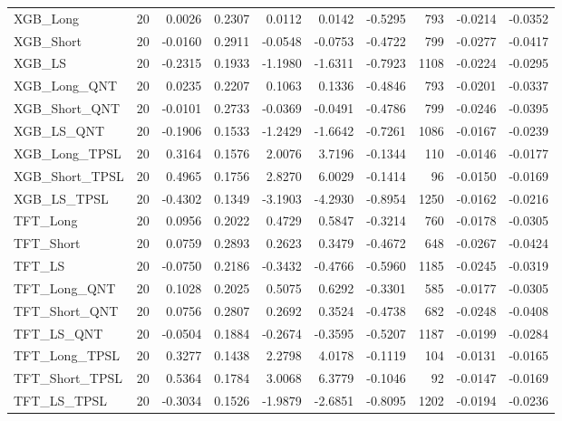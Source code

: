 \begin{tabular}{llrrrrrrrr}
\cline{1-10}
XGB\_Long & 20 & 0.0026 & 0.2307 & 0.0112 & 0.0142 & -0.5295 & 793 & -0.0214 & -0.0352 \\
\cline{1-10}
XGB\_Short & 20 & -0.0160 & 0.2911 & -0.0548 & -0.0753 & -0.4722 & 799 & -0.0277 & -0.0417 \\
\cline{1-10}
XGB\_LS & 20 & -0.2315 & 0.1933 & -1.1980 & -1.6311 & -0.7923 & 1108 & -0.0224 & -0.0295 \\
\cline{1-10}
XGB\_Long\_QNT & 20 & 0.0235 & 0.2207 & 0.1063 & 0.1336 & -0.4846 & 793 & -0.0201 & -0.0337 \\
\cline{1-10}
XGB\_Short\_QNT & 20 & -0.0101 & 0.2733 & -0.0369 & -0.0491 & -0.4786 & 799 & -0.0246 & -0.0395 \\
\cline{1-10}
XGB\_LS\_QNT & 20 & -0.1906 & 0.1533 & -1.2429 & -1.6642 & -0.7261 & 1086 & -0.0167 & -0.0239 \\
\cline{1-10}
XGB\_Long\_TPSL & 20 & 0.3164 & 0.1576 & 2.0076 & 3.7196 & -0.1344 & 110 & -0.0146 & -0.0177 \\
\cline{1-10}
XGB\_Short\_TPSL & 20 & 0.4965 & 0.1756 & 2.8270 & 6.0029 & -0.1414 & 96 & -0.0150 & -0.0169 \\
\cline{1-10}
XGB\_LS\_TPSL & 20 & -0.4302 & 0.1349 & -3.1903 & -4.2930 & -0.8954 & 1250 & -0.0162 & -0.0216 \\
\cline{1-10}
TFT\_Long & 20 & 0.0956 & 0.2022 & 0.4729 & 0.5847 & -0.3214 & 760 & -0.0178 & -0.0305 \\
\cline{1-10}
TFT\_Short & 20 & 0.0759 & 0.2893 & 0.2623 & 0.3479 & -0.4672 & 648 & -0.0267 & -0.0424 \\
\cline{1-10}
TFT\_LS & 20 & -0.0750 & 0.2186 & -0.3432 & -0.4766 & -0.5960 & 1185 & -0.0245 & -0.0319 \\
\cline{1-10}
TFT\_Long\_QNT & 20 & 0.1028 & 0.2025 & 0.5075 & 0.6292 & -0.3301 & 585 & -0.0177 & -0.0305 \\
\cline{1-10}
TFT\_Short\_QNT & 20 & 0.0756 & 0.2807 & 0.2692 & 0.3524 & -0.4738 & 682 & -0.0248 & -0.0408 \\
\cline{1-10}
TFT\_LS\_QNT & 20 & -0.0504 & 0.1884 & -0.2674 & -0.3595 & -0.5207 & 1187 & -0.0199 & -0.0284 \\
\cline{1-10}
TFT\_Long\_TPSL & 20 & 0.3277 & 0.1438 & 2.2798 & 4.0178 & -0.1119 & 104 & -0.0131 & -0.0165 \\
\cline{1-10}
TFT\_Short\_TPSL & 20 & 0.5364 & 0.1784 & 3.0068 & 6.3779 & -0.1046 & 92 & -0.0147 & -0.0169 \\
\cline{1-10}
TFT\_LS\_TPSL & 20 & -0.3034 & 0.1526 & -1.9879 & -2.6851 & -0.8095 & 1202 & -0.0194 & -0.0236 \\

\end{tabular}
